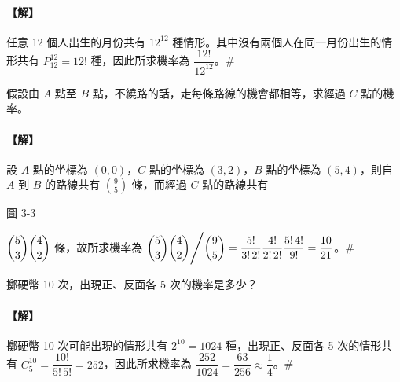 \paragraph{【解】}
任意 12 個人出生的月份共有 $12^{12}$ 種情形。其中沒有兩個人在同一月份出生的情形共有 $P_{12}^{12} = 12!$ 種，因此所求機率為 $\dfrac{12!}{12^{12}}$。\hfill\#

\vspace{1em}
\noindent
\begin{minipage}[c]{0.58\textwidth}
\begin{example}\label{ex:b5s-3-6}
假設由 $A$ 點至 $B$ 點，不繞路的話，走每條路線的機會都相等，求經過 $C$ 點的機率。
\end{example}
\paragraph{【解】}
設 $A$ 點的坐標為 $(0, 0)$，$C$ 點的坐標為 $(3, 2)$，$B$ 點的坐標為 $(5, 4)$，則自 $A$ 到 $B$ 的路線共有 $\binom{9}{5}$ 條，而經過 $C$ 點的路線共有
\end{minipage}\hfill
\begin{minipage}[c]{0.38\textwidth}
\centering
{}
\par\vspace{0.3em}
{\small 圖 3-3}
\end{minipage}

\vspace{0.4em}
\noindent
$\dbinom{5}{3}\dbinom{4}{2}$ 條，故所求機率為 $\dbinom{5}{3}\dbinom{4}{2} \Bigg/ \dbinom{9}{5} = \dfrac{5!}{3!\,2!} \dfrac{4!}{2!\,2!} \dfrac{5!\,4!}{9!} = \dfrac{10}{21}$。\hfill\#

\vspace{1em}
\begin{example}[重複試驗]\label{ex:b5s-3-7}
擲硬幣 10 次，出現正、反面各 5 次的機率是多少？
\end{example}
\paragraph{【解】}
擲硬幣 10 次可能出現的情形共有 $2^{10} = 1024$ 種，出現正、反面各 5 次的情形共有 $C_5^{10} = \dfrac{10!}{5!\,5!} = 252$，因此所求機率為 $\dfrac{252}{1024} = \dfrac{63}{256} \approx \dfrac{1}{4}$。\hfill\#

